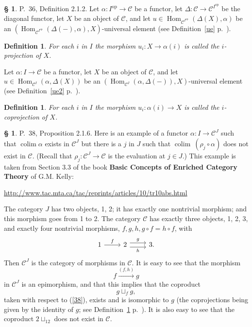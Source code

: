 \documentclass[12pt]{article}
\newtheorem{df}[thm]{Definition}%
\theoremstyle{remark}
\theoremstyle{definition}
\newtheorem{s}[thm]{\S}
\newcommand{\C}{\mathcal C}
\DeclareMathOperator*{\co}{colim}
\DeclareMathOperator{\Hom}{Hom}%
\DeclareMathOperator{\op}{op}
\begin{document}
%
%
\begin{s} 
P.~36, Definition 2.1.2. Let $\alpha:I^{\op}\to\C$ be a functor, let $\Delta:\C\to\C^{I^{\op}}$ be the diagonal functor, let $X$ be an object of $\C$, and let $u\in\Hom_{\C^{I^{\op}}}(\Delta(X),\alpha)$ be an $(\Hom_{\C^{I^{\op}}}(\Delta(-),\alpha),X)$-universal element (see Definition~\ref{ue} p.~\pageref{ue}). 
%
\begin{df}\label{p}
For each $i$ in $I$ the morphism $u_i:X\to\alpha(i)$ is called the $i$-{\em projection} of $X$.
\end{df}

Let $\alpha:I\to\C$ be a functor, let $X$ be an object of $\C$, and let $u\in\Hom_{\C^I}(\alpha,\Delta(X))$ be an $(\Hom_{\C^I}(\alpha,\Delta(-)),X)$-universal element (see Definition~\ref{ue2} p.~\pageref{ue2}). 
%
\begin{df}\label{c}
For each $i$ in $I$ the morphism $u_i:\alpha(i)\to X$ is called the $i$-{\em coprojection} of $X$.
\end{df}
\end{s}
%
%
\begin{s}\label{c38}
P.~38, Proposition 2.1.6. Here is an example of a functor $\alpha:I\to\C^J$ such that $\co\alpha$ exists in $\C^J$ but there is a $j$ in $J$ such that $\co\ (\rho_j\circ\alpha)$ does not exist in $\C$. (Recall that $\rho_j:\C^J\to\C$ is the evaluation at $j\in J$.) This example is taken from Section 3.3 of the book \textbf{Basic Concepts of Enriched Category Theory} of G.M. Kelly:%
%
\begin{center}\href{http://www.tac.mta.ca/tac/reprints/articles/10/tr10abs.html}{http://www.tac.mta.ca/tac/reprints/articles/10/tr10abs.html}
\end{center}

The category $J$ has two objects, 1, 2; it has exactly one nontrivial morphism; and this morphism goes from 1 to 2. The category $\C$ has exactly three objects, 1, 2, 3, and exactly four nontrivial morphisms, $f,g,h,g\circ f=h\circ f$, with 
$$
\begin{tikzcd}
1\ar{r}{f}&2\ar[yshift=.7ex]{r}{g}\ar[yshift=-.7ex]{r}[swap]{h}&3.
\end{tikzcd}
$$ 
Then $\C^J$ is the category of morphisms in $\C$. It is easy to see that the morphism 
%
\begin{equation}\label{38}
f\xrightarrow{(f,h)}g 
\end{equation}
%
in $\C^J$ is an epimorphism, and that this implies that the coproduct 
$$
g\sqcup_fg,
$$ 
taken with respect to (\ref{38}), exists and is isomorphic to $g$ (the coprojections being given by the identity of $g$; see Definition~\ref{c} p.~\pageref{c}). It is also easy to see that the coproduct $2\sqcup_12$ does not exist in $\C$.
\end{s}
\end{document}

